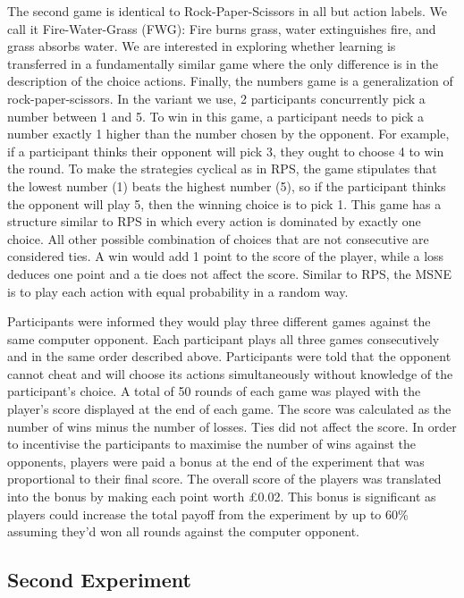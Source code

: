 \documentclass[man,floatsintext]{apa6}
\begin{document}
The second game is identical to Rock-Paper-Scissors in all but action labels. We call it Fire-Water-Grass (FWG): Fire burns grass, water extinguishes fire, and grass absorbs water. We are interested in exploring whether learning is transferred in a fundamentally similar game where the only difference is in the description of the choice actions. Finally, the numbers game is a generalization of rock-paper-scissors. In the variant we use, 2 participants concurrently pick a number between 1 and 5. To win in this game, a participant needs to pick a number exactly 1 higher than the number chosen by the opponent. For example, if a participant thinks their opponent will pick 3, they ought to choose 4 to win the round. To make the strategies cyclical as in RPS, the game stipulates that the lowest number (1) beats the highest number (5), so if the participant thinks the opponent will play 5, then the winning choice is to pick 1. This game has a structure similar to RPS in which every action is dominated by exactly one choice. All other possible combination of choices that are not consecutive are considered ties. A win would add 1 point to the score of the player, while a loss deduces one point and a tie does not affect the score. Similar to RPS, the MSNE is to play each action with equal probability in a random way.

Participants were informed they would play three different games against the same computer opponent. Each participant plays all three games consecutively and in the same order described above. Participants were told that the opponent cannot cheat and will choose its actions simultaneously without knowledge of the participant's choice. A total of 50 rounds of each game was played with the player's score displayed at the end of each game. The score was calculated as the number of wins minus the number of losses. Ties did not affect the score. In order to incentivise the participants to maximise the number of wins against the opponents, players were paid a bonus at the end of the experiment that was proportional to their final score. The overall score of the players was translated into the bonus by making each point worth £0.02. This bonus is significant as players could increase the total payoff from the experiment by up to 60\% assuming they'd won all rounds against the computer opponent.

\hypertarget{second-experiment}{%
\subsection{Second Experiment}\label{second-experiment}}
\end{document}
